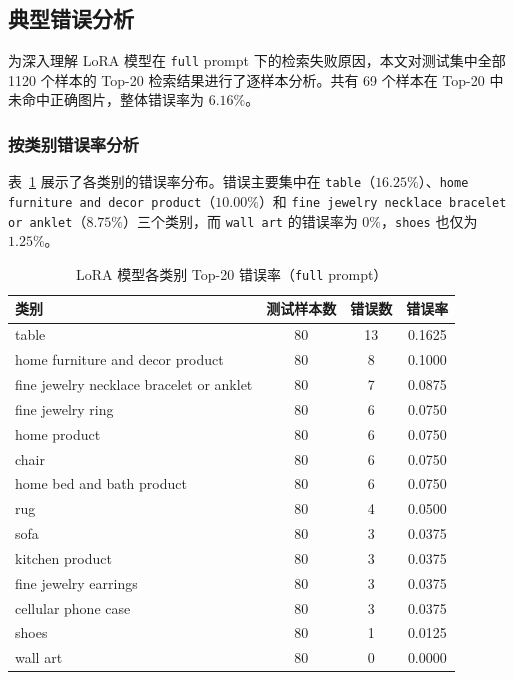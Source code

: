 \documentclass[11pt, a4paper]{ctexart}
\begin{document}
\subsection{典型错误分析}

为深入理解 LoRA 模型在 \texttt{full} prompt 下的检索失败原因，本文对测试集中全部 1120 个样本的 Top-20 检索结果进行了逐样本分析。共有 69 个样本在 Top-20 中未命中正确图片，整体错误率为 $6.16\%$。

\subsubsection*{按类别错误率分析}

表~\ref{tab:error-by-category} 展示了各类别的错误率分布。错误主要集中在 \texttt{table}（$16.25\%$）、\texttt{home furniture and decor product}（$10.00\%$）和 \texttt{fine jewelry necklace bracelet or anklet}（$8.75\%$）三个类别，而 \texttt{wall art} 的错误率为 $0\%$，\texttt{shoes} 也仅为 $1.25\%$。

\begin{table}[!htbp]
    \centering
    \caption{LoRA 模型各类别 Top-20 错误率（\texttt{full} prompt）}
    \label{tab:error-by-category}
    \small
    \begin{tabular}{lccc}
        \toprule
        \textbf{类别} & \textbf{测试样本数} & \textbf{错误数} & \textbf{错误率} \\
        \midrule
        table & 80 & 13 & 0.1625 \\
        home furniture and decor product & 80 & 8 & 0.1000 \\
        fine jewelry necklace bracelet or anklet & 80 & 7 & 0.0875 \\
        fine jewelry ring & 80 & 6 & 0.0750 \\
        home product & 80 & 6 & 0.0750 \\
        chair & 80 & 6 & 0.0750 \\
        home bed and bath product & 80 & 6 & 0.0750 \\
        rug & 80 & 4 & 0.0500 \\
        sofa & 80 & 3 & 0.0375 \\
        kitchen product & 80 & 3 & 0.0375 \\
        fine jewelry earrings & 80 & 3 & 0.0375 \\
        cellular phone case & 80 & 3 & 0.0375 \\
        shoes & 80 & 1 & 0.0125 \\
        wall art & 80 & 0 & 0.0000 \\
        \bottomrule
    \end{tabular}
\end{table}
\FloatBarrier
\end{document}
